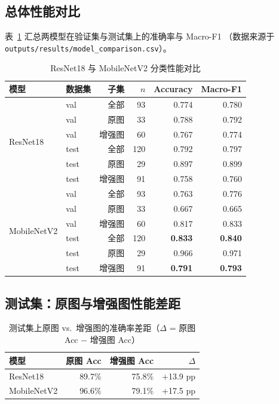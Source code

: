 \documentclass[12pt,a4paper]{ctexart}
\begin{document}
\subsection{总体性能对比}

表~\ref{tab:main_results} 汇总两模型在验证集与测试集上的准确率与 Macro-F1
（数据来源于 \texttt{outputs/results/model\_comparison.csv}）。

\begin{table}[H]
  \centering
  \caption{ResNet18 与 MobileNetV2 分类性能对比}
  \label{tab:main_results}
  \begin{tabular}{llrrrr}
    \toprule
    模型 & 数据集 & 子集 & $n$ & Accuracy & Macro-F1 \\
    \midrule
    \multirow{6}{*}{ResNet18}
      & val  & 全部   & 93  & 0.774 & 0.780 \\
      & val  & 原图   & 33  & 0.788 & 0.792 \\
      & val  & 增强图 & 60  & 0.767 & 0.774 \\
      & test & 全部   & 120 & 0.792 & 0.797 \\
      & test & 原图   & 29  & 0.897 & 0.899 \\
      & test & 增强图 & 91  & 0.758 & 0.760 \\
    \midrule
    \multirow{6}{*}{MobileNetV2}
      & val  & 全部   & 93  & 0.763 & 0.776 \\
      & val  & 原图   & 33  & 0.667 & 0.665 \\
      & val  & 增强图 & 60  & 0.817 & 0.833 \\
      & test & 全部   & 120 & \textbf{0.833} & \textbf{0.840} \\
      & test & 原图   & 29  & 0.966 & 0.971 \\
      & test & 增强图 & 91  & \textbf{0.791} & \textbf{0.793} \\
    \bottomrule
  \end{tabular}
\end{table}

\subsection{测试集：原图与增强图性能差距}

\begin{table}[H]
  \centering
  \caption{测试集上原图 vs.\ 增强图的准确率差距（$\Delta$ = 原图 Acc $-$ 增强图 Acc）}
  \label{tab:gap}
  \begin{tabular}{lrrr}
    \toprule
    模型 & 原图 Acc & 增强图 Acc & $\Delta$ \\
    \midrule
    ResNet18     & 89.7\% & 75.8\% & +13.9 pp \\
    MobileNetV2  & 96.6\% & 79.1\% & +17.5 pp \\
    \bottomrule
  \end{tabular}
\end{table}
\end{document}

